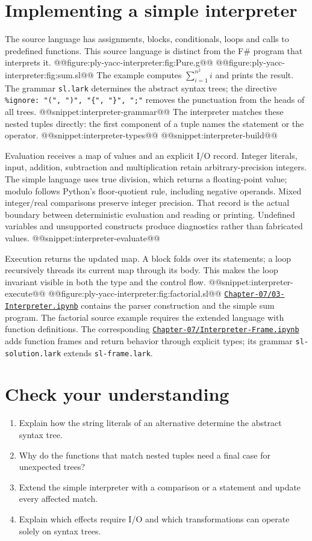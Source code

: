 \section{Implementing a simple interpreter \label{chapter:interpreter}}
The source language has assignments, blocks, conditionals, loops and calls to predefined functions.
This source language is distinct from the F\# program that interprets it.
@@figure:ply-yacc-interpreter:fig:Pure.g@@
@@figure:ply-yacc-interpreter:fig:sum.sl@@
The example computes $\sum_{i=1}^{n^2} i$ and prints the result.
The grammar \texttt{sl.lark} determines the abstract syntax trees; the directive \texttt{\%ignore: "(", ")", "\{", "\}", ";"} removes the punctuation from the heads of all trees.
@@snippet:interpreter-grammar@@
The interpreter matches these nested tuples directly: the first component of a tuple names the statement or the operator.
@@snippet:interpreter-types@@
@@snippet:interpreter-build@@

Evaluation receives a map of values and an explicit I/O record.
Integer literals, input, addition, subtraction and multiplication retain arbitrary-precision integers.
The simple language uses true division, which returns a floating-point value; modulo follows Python's floor-quotient rule, including negative operands.
Mixed integer/real comparisons preserve integer precision.
That record is the actual boundary between deterministic evaluation and reading or printing.
Undefined variables and unsupported constructs produce diagnostics rather than fabricated values.
@@snippet:interpreter-evaluate@@

Execution returns the updated map.
A block folds over its statements; a loop recursively threads its current map through its body.
This makes the loop invariant visible in both the type and the control flow.
@@snippet:interpreter-execute@@
@@figure:ply-yacc-interpreter:fig:factorial.sl@@
\href{../../Chapter-07/03-Interpreter.ipynb}{\nolinkurl{Chapter-07/03-Interpreter.ipynb}} contains the parser construction and the simple sum program.
The factorial source example requires the extended language with function definitions.
The corresponding \href{../../Chapter-07/Interpreter-Frame.ipynb}{\nolinkurl{Chapter-07/Interpreter-Frame.ipynb}} adds function frames and return behavior through explicit types; its grammar \texttt{sl-solution.lark} extends \texttt{sl-frame.lark}.

\section{Check your understanding}
\begin{enumerate}
\item Explain how the string literals of an alternative determine the abstract syntax tree.
\item Why do the functions that match nested tuples need a final case for unexpected trees?
\item Extend the simple interpreter with a comparison or a statement and update every affected match.
\item Explain which effects require I/O and which transformations can operate solely on syntax trees.
\end{enumerate}

